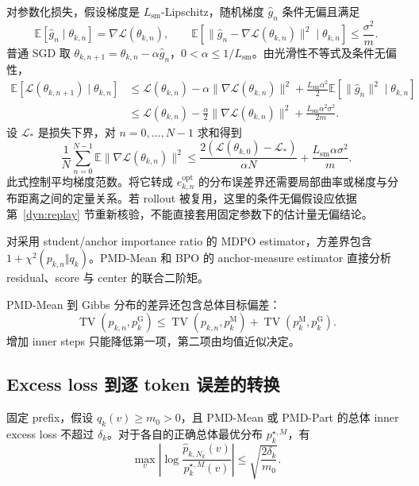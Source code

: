 \documentclass[lang=cn,scheme=chinese,openany]{../book/elegantbook}
\begin{document}
对参数化损失，假设梯度是 $L_{\mathrm{sm}}$-Lipschitz，随机梯度 $\widehat g_n$ 条件无偏且满足
\begin{equation*}
\mathbb E[\widehat g_n\mid\theta_{k,n}]=\nabla\mathcal L(\theta_{k,n}),\qquad
\mathbb E\!\left[\|\widehat g_n-\nabla\mathcal L(\theta_{k,n})\|^2\mid\theta_{k,n}\right]\le\frac{\sigma^2}{m}.
\end{equation*}
普通 SGD 取 $\theta_{k,n+1}=\theta_{k,n}-\alpha\widehat g_n$，$0<\alpha\le 1/L_{\mathrm{sm}}$。由光滑性不等式及条件无偏性，
\begin{align*}
\mathbb E[\mathcal L(\theta_{k,n+1})\mid\theta_{k,n}]
&\le\mathcal L(\theta_{k,n})-\alpha\|\nabla\mathcal L(\theta_{k,n})\|^2
+\frac{L_{\mathrm{sm}}\alpha^2}{2}\mathbb E[\|\widehat g_n\|^2\mid\theta_{k,n}]\\
&\le\mathcal L(\theta_{k,n})-\frac\alpha2\|\nabla\mathcal L(\theta_{k,n})\|^2
+\frac{L_{\mathrm{sm}}\alpha^2\sigma^2}{2m}.
\end{align*}
设 $\mathcal L_*$ 是损失下界，对 $n=0,\ldots,N-1$ 求和得到
\begin{equation*}
\frac1N\sum_{n=0}^{N-1}\mathbb E\|\nabla\mathcal L(\theta_{k,n})\|^2
\le\frac{2(\mathcal L(\theta_{k,0})-\mathcal L_*)}{\alpha N}
+\frac{L_{\mathrm{sm}}\alpha\sigma^2}{m}.
\end{equation*}
此式控制平均梯度范数。将它转成 $e^{\mathrm{opt}}_{k,n}$ 的分布误差界还需要局部曲率或梯度与分布距离之间的定量关系。若 rollout 被复用，这里的条件无偏假设应依据第~\ref{dyn:replay} 节重新核验，不能直接套用固定参数下的估计量无偏结论。

对采用 student/anchor importance ratio 的 MDPO estimator，方差界包含 $1+\chi^2(p_{k,n}\Vert q_k)$。PMD-Mean 和 BPO 的 anchor-measure estimator 直接分析 residual、score 与 center 的联合二阶矩。

PMD-Mean 到 Gibbs 分布的差异还包含总体目标偏差：
\begin{equation*}
\operatorname{TV}(p_{k,n},p_k^{\mathrm G})
\le\operatorname{TV}(p_{k,n},p_k^{\mathrm M})
+\operatorname{TV}(p_k^{\mathrm M},p_k^{\mathrm G}).
\end{equation*}
增加 inner steps 只能降低第一项，第二项由均值近似决定。

\subsection{Excess loss 到逐 token 误差的转换}

\begin{proposition}
固定 prefix，假设 $q_k(v)\geq m_0>0$，且 PMD-Mean 或 PMD-Part 的总体 inner excess loss 不超过 $\delta_k$。对于各自的正确总体最优分布 $p_k^{\star,M}$，有
\begin{equation*}
 \max_v\left|\log\frac{\widehat p_{k,N_k}(v)}{p_k^{\star,M}(v)}\right|
 \leq\sqrt{\frac{2\delta_k}{m_0}}.
\end{equation*}
\end{proposition}
\end{document}
